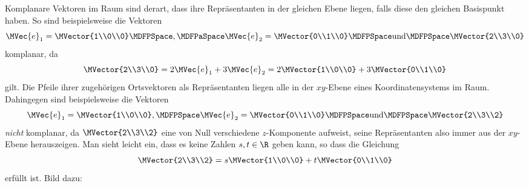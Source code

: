 \begin{MIntro}
\begin{center}
{
} 
\end{center}
Komplanare Vektoren im Raum sind derart, dass ihre Repräsentanten in der gleichen Ebene liegen, falls diese den gleichen Basispunkt haben. So sind beispielsweise die Vektoren 
\[
 \MVec{e}_1=\MVector{1\\0\\0}\MDFPSpace,\MDFPaSpace\MVec{e}_2=\MVector{0\\1\\0}\MDFPSpace\textrm{und}\MDFPSpace\MVector{2\\3\\0}
\]
komplanar, da 
\[
 \MVector{2\\3\\0}=2\MVec{e}_1 + 3\MVec{e}_2=2\MVector{1\\0\\0}+3\MVector{0\\1\\0}
\]
gilt. Die Pfeile ihrer zugehörigen Ortsvektoren als Repräsentanten liegen alle in der $x y$-Ebene eines Koordinatensystems im Raum. Dahingegen sind beispielsweise die Vektoren 
\[
 \MVec{e}_1=\MVector{1\\0\\0},\MDFPSpace\MVec{e}_2=\MVector{0\\1\\0}\MDFPSpace\textrm{und}\MDFPSpace\MVector{2\\3\\2}
\]
\textit{nicht} komplanar, da $\MVector{2\\3\\2}$ eine von Null verschiedene $z$-Komponente aufweist, seine Repräsentanten also immer aus der $x y$-Ebene herauszeigen. Man sieht leicht ein, dass es keine Zahlen $s,t\in\R$ geben kann, so dass die Gleichung
\[
 \MVector{2\\3\\2}=s\MVector{1\\0\\0}+t\MVector{0\\1\\0}
\]
erfüllt ist. Bild dazu:
\begin{center}
\end{center}
\end{MIntro}
